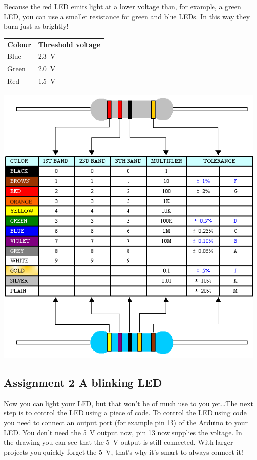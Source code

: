 \documentclass{arduino}
\begin{document}
Because the red LED emits light at a lower voltage than, for example, a green LED, you can use a smaller resistance for green and blue LEDs. In this way they burn just as brightly!

\begin{tabular}{ll}
\textbf{Colour} & \textbf{Threshold voltage}\\
Blue & \SI{2.3}{\volt} \\ 
Green & \SI{2.0}{\volt} \\
Red  & \SI{1.5}{\volt} \\
\end{tabular}

\begin{minipage}[t]{\linewidth}
\includegraphics[width=0.8\linewidth]{7. Component resistor values (EN)}
\end{minipage}

\newpage
\subsection{Assignment 2 A blinking LED}


Now you can light your LED, but that won't be of much use to you yet\dots The next step is to control the LED using a piece of code. To control the LED using code you need to connect an output port (for example pin 13) of the Arduino to your LED. You don't need the \SI{5}{\volt} output now, pin 13 now supplies the voltage. In the drawing you can see that the \SI{5}{\volt} output is still connected. With larger projects you quickly forget the \SI{5}{\volt}, that's why it's smart to always connect it!
\end{document}
